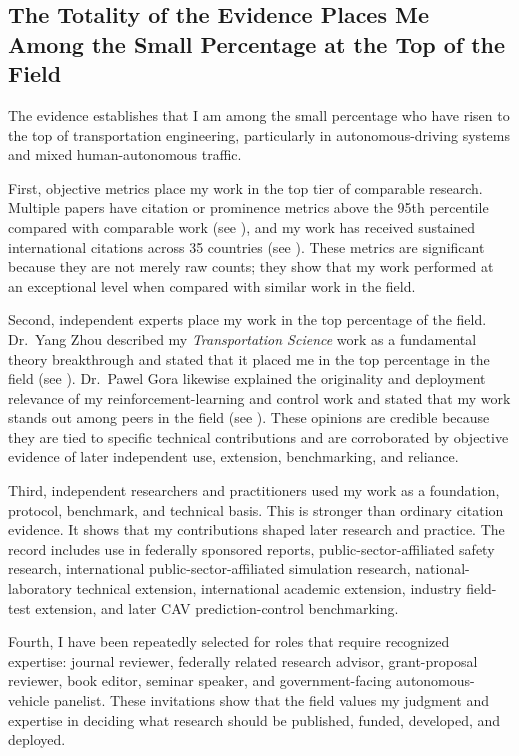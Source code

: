 \documentclass[11pt,letterpaper]{article}
\begin{document}
\subsection{The Totality of the Evidence Places Me Among the Small Percentage at the Top of the Field}

The evidence establishes that I am among the small percentage who have risen to the top of transportation engineering, particularly in autonomous-driving systems and mixed human-autonomous traffic.

First, objective metrics place my work in the top tier of comparable research. Multiple papers have citation or prominence metrics above the 95th percentile compared with comparable work (see ), and my work has received sustained international citations across 35 countries (see ). These metrics are significant because they are not merely raw counts; they show that my work performed at an exceptional level when compared with similar work in the field.

Second, independent experts place my work in the top percentage of the field. Dr.~Yang Zhou described my \textit{Transportation Science} work as a fundamental theory breakthrough and stated that it placed me in the top percentage in the field (see ). Dr.~Pawel Gora likewise explained the originality and deployment relevance of my reinforcement-learning and control work and stated that my work stands out among peers in the field (see ). These opinions are credible because they are tied to specific technical contributions and are corroborated by objective evidence of later independent use, extension, benchmarking, and reliance.

Third, independent researchers and practitioners used my work as a foundation, protocol, benchmark, and technical basis. This is stronger than ordinary citation evidence. It shows that my contributions shaped later research and practice. The record includes use in federally sponsored reports, public-sector-affiliated safety research, international public-sector-affiliated simulation research, national-laboratory technical extension, international academic extension, industry field-test extension, and later CAV prediction-control benchmarking.

Fourth, I have been repeatedly selected for roles that require recognized expertise: journal reviewer, federally related research advisor, grant-proposal reviewer, book editor, seminar speaker, and government-facing autonomous-vehicle panelist. These invitations show that the field values my judgment and expertise in deciding what research should be published, funded, developed, and deployed.
\end{document}

